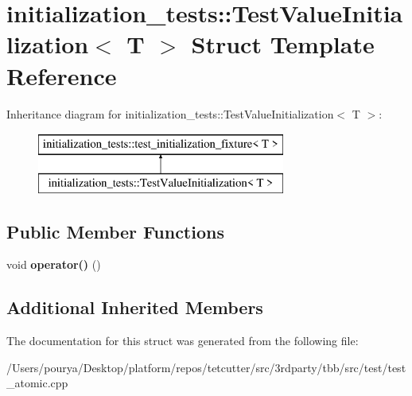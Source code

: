 \hypertarget{structinitialization__tests_1_1TestValueInitialization}{}\section{initialization\+\_\+tests\+:\+:Test\+Value\+Initialization$<$ T $>$ Struct Template Reference}
\label{structinitialization__tests_1_1TestValueInitialization}
Inheritance diagram for initialization\+\_\+tests\+:\+:Test\+Value\+Initialization$<$ T $>$\+:\begin{figure}[H]
\begin{center}
\leavevmode
\includegraphics[height=2.000000cm]{structinitialization__tests_1_1TestValueInitialization}
\end{center}
\end{figure}
\subsection*{Public Member Functions}
\begin{DoxyCompactItemize}
\item 
\hypertarget{structinitialization__tests_1_1TestValueInitialization_a81a40709498455b24a0fd911f5394104}{}void {\bfseries operator()} ()\label{structinitialization__tests_1_1TestValueInitialization_a81a40709498455b24a0fd911f5394104}

\end{DoxyCompactItemize}
\subsection*{Additional Inherited Members}


The documentation for this struct was generated from the following file\+:\begin{DoxyCompactItemize}
\item 
/\+Users/pourya/\+Desktop/platform/repos/tetcutter/src/3rdparty/tbb/src/test/test\+\_\+atomic.\+cpp\end{DoxyCompactItemize}
